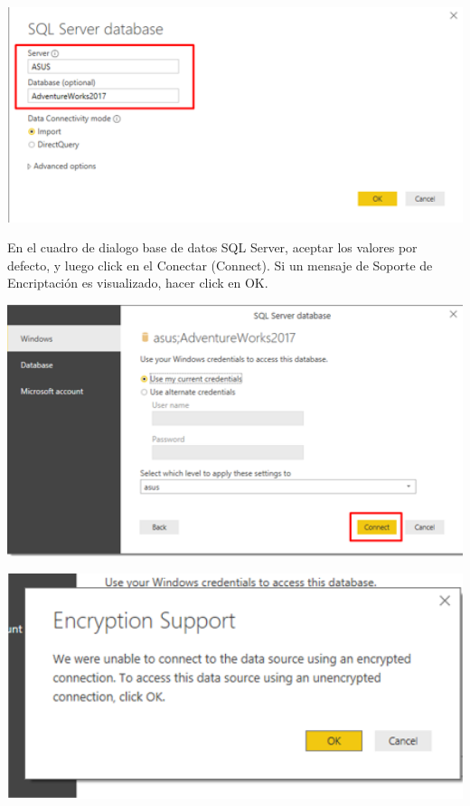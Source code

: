 \documentclass[12pt,letterpaper]{article}
\begin{document}
\begin{center}
    \includegraphics[width=16cm]{img/4.png}  
\end{center}
En el cuadro de dialogo base de datos SQL Server, aceptar los valores por defecto, y luego click en el
Conectar (Connect). Si un mensaje de Soporte de Encriptación es visualizado, hacer click en OK.
\begin{center}
    \includegraphics[width=16cm]{img/5.png}  
\end{center}
\begin{center}
    \includegraphics[width=16cm]{img/6.png}  
\end{center}
\end{document}
